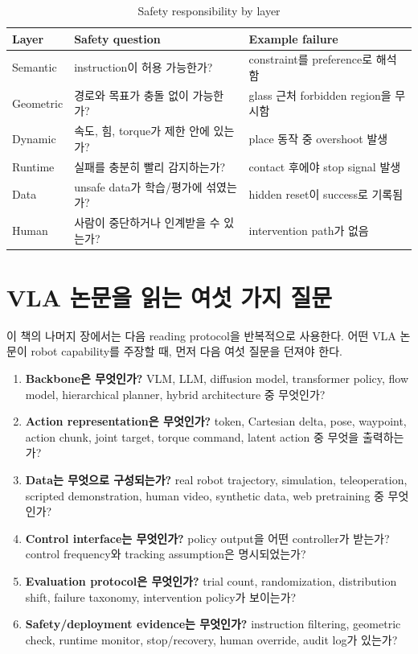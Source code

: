 \begin{table}[ht]
\centering
\caption{Safety responsibility by layer}
\label{tab:safety}
\small
\begin{tabularx}{\textwidth}{p{30mm}X X}
\toprule
Layer & Safety question & Example failure \\
\midrule
Semantic & instruction이 허용 가능한가? & constraint를 preference로 해석함 \\
Geometric & 경로와 목표가 충돌 없이 가능한가? & glass 근처 forbidden region을 무시함 \\
Dynamic & 속도, 힘, torque가 제한 안에 있는가? & place 동작 중 overshoot 발생 \\
Runtime & 실패를 충분히 빨리 감지하는가? & contact 후에야 stop signal 발생 \\
Data & unsafe data가 학습/평가에 섞였는가? & hidden reset이 success로 기록됨 \\
Human & 사람이 중단하거나 인계받을 수 있는가? & intervention path가 없음 \\
\bottomrule
\end{tabularx}
\end{table}

\section{VLA 논문을 읽는 여섯 가지 질문}

이 책의 나머지 장에서는 다음 reading protocol을 반복적으로 사용한다. 어떤 VLA 논문이 robot capability를 주장할 때, 먼저 다음 여섯 질문을 던져야 한다.

\begin{enumerate}
  \item \textbf{Backbone은 무엇인가?} VLM, LLM, diffusion model, transformer policy, flow model, hierarchical planner, hybrid architecture 중 무엇인가?
  \item \textbf{Action representation은 무엇인가?} token, Cartesian delta, pose, waypoint, action chunk, joint target, torque command, latent action 중 무엇을 출력하는가?
  \item \textbf{Data는 무엇으로 구성되는가?} real robot trajectory, simulation, teleoperation, scripted demonstration, human video, synthetic data, web pretraining 중 무엇인가?
  \item \textbf{Control interface는 무엇인가?} policy output을 어떤 controller가 받는가? control frequency와 tracking assumption은 명시되었는가?
  \item \textbf{Evaluation protocol은 무엇인가?} trial count, randomization, distribution shift, failure taxonomy, intervention policy가 보이는가?
  \item \textbf{Safety/deployment evidence는 무엇인가?} instruction filtering, geometric check, runtime monitor, stop/recovery, human override, audit log가 있는가?
\end{enumerate}

